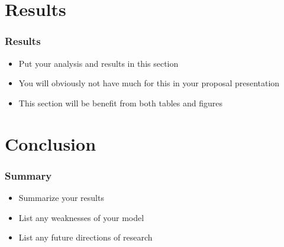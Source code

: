 \documentclass{beamer}
\begin{document}
\section{Results}

  \begin{frame}
  \frametitle{Results}
    \begin{itemize}
      \item Put your analysis and results in this section
      \vspace{5mm}
      \item You will obviously not have much for this in your proposal presentation
      \vspace{5mm}
      \item This section will be benefit from both tables and figures
    \end{itemize}
  \end{frame}


\section{Conclusion}

  \begin{frame}
    \frametitle{Summary}
    \begin{itemize}
      \item Summarize your results
      \vspace{5mm}
      \item List any weaknesses of your model
      \vspace{5mm}
      \item List any future directions of research
    \end{itemize}
  \end{frame}
\end{document}
